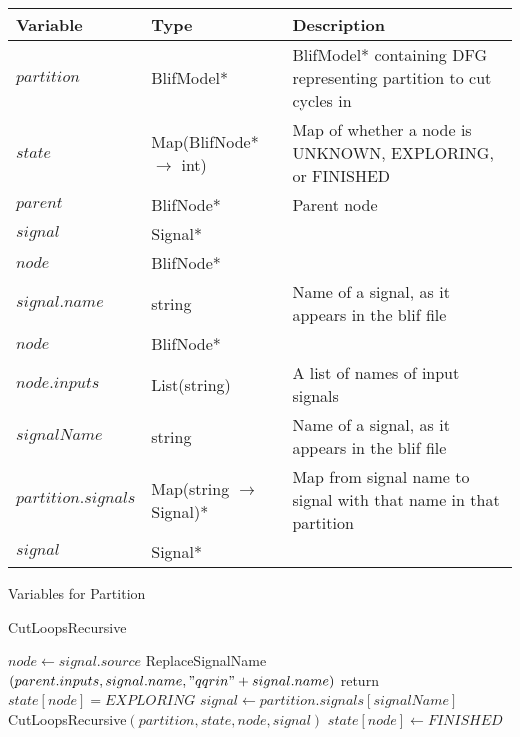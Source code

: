 \documentclass[12pt,final,oneside]{article} %
\begin{document}
\begin{algorithm}
    \begin{center}
        \begin{tabularx}{\linewidth}{llX}
        \toprule
        Variable & Type & Description\\
        \midrule
        $partition$ & BlifModel* & BlifModel* containing DFG representing partition to cut cycles in\\
        $state$ & Map(BlifNode* $\to$ int) & Map of whether a node is UNKNOWN, EXPLORING, or FINISHED\\
        $parent$ &BlifNode* & Parent node \\
        $signal$ & Signal* & \\
        $node$ &BlifNode* &\\
        $signal.name$ & string & Name of a signal, as it appears in the blif file\\
        $node$ &BlifNode* &\\
        $node.inputs$ &List(string) & A list of names of input signals\\
        $signalName$ & string & Name of a signal, as it appears in the blif file\\
        $partition.signals$ & Map(string $\to$ Signal)* & Map from signal name to signal with that name in that partition \\
        $signal$ & Signal* & \\
        \bottomrule
        \end{tabularx}
        \caption{Variables for Partition}
        \label{varPart}
    \end{center}
   \caption{CutLoopsRecursive}\label{main}
   \begin{algorithmic}[1]
            \State $node \gets signal.source$
               \State ReplaceSignalName$(parent.inputs, signal.name, "qqrin"+signal.name)$
             
               \State return
            \Else{}
               \State $state[node] = EXPLORING$
                  \State $signal \gets partition.signals[signalName]$
                  \State CutLoopsRecursive$(partition, state, node, signal)$
               \EndFor
            \EndIf
            \State $state[node] \gets FINISHED$
         \EndProcedure
   \end{algorithmic}
\end{algorithm}
\end{document}
